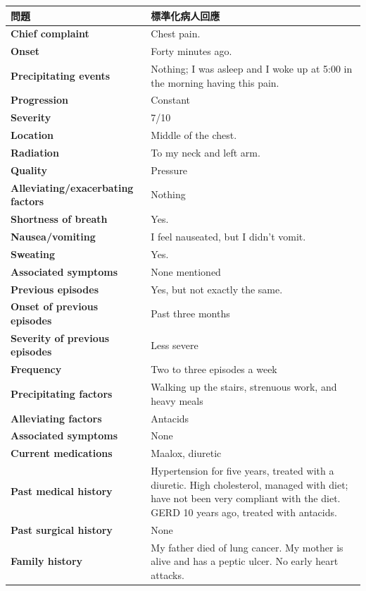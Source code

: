 \documentclass[12pt,a4paper]{article}
\begin{document}
\begin{longtable}{>{\bfseries}p{5cm}p{9cm}}
\toprule
\textbf{問題} & \textbf{標準化病人回應} \\
\midrule
\endhead
Chief complaint & Chest pain. \\
\midrule
Onset & Forty minutes ago. \\
\midrule
Precipitating events & Nothing; I was asleep and I woke up at 5:00 in the morning having this pain. \\
\midrule
Progression & Constant \\
\midrule
Severity & 7/10 \\
\midrule
Location & Middle of the chest. \\
\midrule
Radiation & To my neck and left arm. \\
\midrule
Quality & Pressure \\
\midrule
Alleviating/exacerbating factors & Nothing \\
\midrule
Shortness of breath & Yes. \\
\midrule
Nausea/vomiting & I feel nauseated, but I didn't vomit. \\
\midrule
Sweating & Yes. \\
\midrule
Associated symptoms & None mentioned \\
\midrule
Previous episodes & Yes, but not exactly the same. \\
\midrule
Onset of previous episodes & Past three months \\
\midrule
Severity of previous episodes & Less severe \\
\midrule
Frequency & Two to three episodes a week \\
\midrule
Precipitating factors & Walking up the stairs, strenuous work, and heavy meals \\
\midrule
Alleviating factors & Antacids \\
\midrule
Associated symptoms & None \\
\midrule
Current medications & Maalox, diuretic \\
\midrule
Past medical history & Hypertension for five years, treated with a diuretic. High cholesterol, managed with diet; have not been very compliant with the diet. GERD 10 years ago, treated with antacids. \\
\midrule
Past surgical history & None \\
\midrule
Family history & My father died of lung cancer. My mother is alive and has a peptic ulcer. No early heart attacks. \\
\midrule

\end{longtable}
\end{document}
